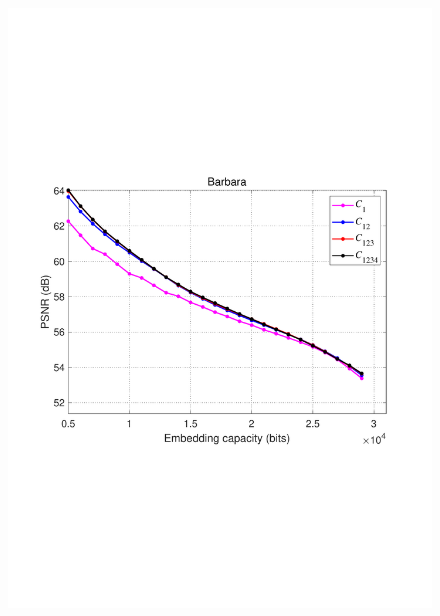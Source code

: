 \documentclass[review,3p,10pt,sort&compress]{elsarticle}
\begin{document}
\begin{figure}
{\begin{minipage}[t]{0.39\linewidth}
\includegraphics[width=1\textwidth]{figures/Result/size/Barbara.pdf}
\end{minipage}
}


\end{figure}
\end{document}
